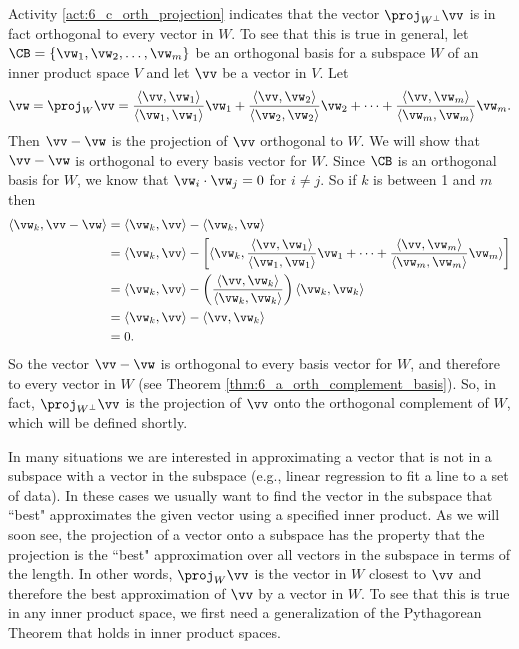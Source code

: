 Activity \ref{act:6_c_orth_projection} indicates that the vector $\proj_{W^{\perp}} \vv$ is in fact orthogonal to every vector in $W$. To see that this is true in general, let $\CB = \{\vw_1, \vw_2, \ldots, \vw_m\}$ be an orthogonal basis for a subspace $W$ of an inner product space $V$ and let $\vv$ be a vector in $V$. Let 
\[\vw =  \proj_W \vv = \frac{\langle \vv, \vw_1\rangle }{\langle \vw_1, \vw_1 \rangle} \vw_1 + \frac{\langle \vv,  \vw_2 \rangle}{\langle \vw_2, \vw_2 \rangle}  \vw_2 + \cdots + \frac{\langle \vv,  \vw_m \rangle}{\langle \vw_m, \vw_m \rangle}  \vw_m.\]
Then $\vv - \vw$ is the projection of $\vv$ orthogonal to $W$. We will show that $\vv - \vw$ is orthogonal to every basis vector for $W$. Since $\CB$ is an orthogonal basis for $W$, we know that $\vw_i \cdot \vw_j = 0$ for $i \neq j$. So if $k$ is between 1 and $m$ then
\begin{align*}
\langle \vw_k, \vv - \vw \rangle &= \langle \vw_k, \vv \rangle - \langle \vw_k, \vw \rangle \\
	&= \langle \vw_k, \vv \rangle - \left[ \langle \vw_k,  \frac{\langle \vv, \vw_1 \rangle }{\langle \vw_1, \vw_1 \rangle } \vw_1 +  \cdots + \frac{\langle \vv, \vw_m \rangle}{\langle \vw_m, \vw_m \rangle} \vw_m  \rangle \right] \\
	&= \langle \vw_k, \vv \rangle - \left(\frac{ \langle \vv, \vw_k \rangle}{\langle \vw_k, \vw_k \rangle }\right) \langle \vw_k, \vw_k \rangle \\
	&= \langle \vw_k, \vv \rangle - \langle \vv, \vw_k \rangle \\
	&= 0.
\end{align*}
So the vector $\vv - \vw$ is orthogonal to every basis vector for $W$, and therefore to every vector in $W$ (see Theorem \ref{thm:6_a_orth_complement_basis}). So, in fact, $\proj_{W^\perp} \vv$ is the projection of $\vv$ onto the orthogonal complement of $W$, which will be defined shortly. 
 

In many situations we are interested in approximating a vector that is not in a subspace with a vector in the subspace (e.g., linear regression to fit a line to a set of data). In these cases we usually want to find the vector in the subspace that ``best" approximates the given vector using a specified inner product. As we will soon see, the projection of a vector onto a subspace has the property that the projection is the ``best" approximation over all vectors in the subspace in terms of the length. In other words, $\proj_W \vv$ is the vector in $W$ closest to $\vv$ and therefore the best approximation of $\vv$ by a vector in $W$. To see that this is true in any inner product space, we first need a generalization of the Pythagorean Theorem that holds in inner product spaces.

